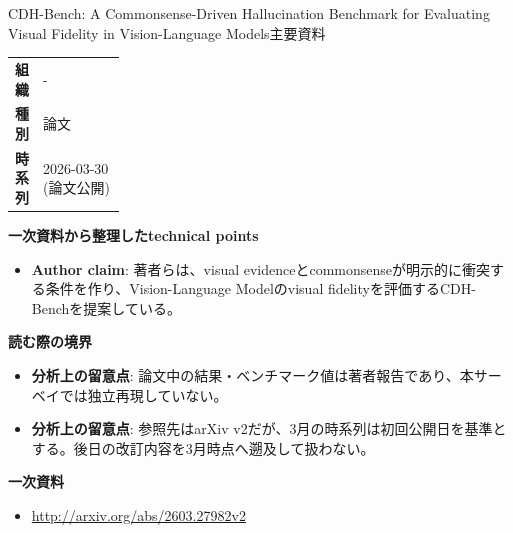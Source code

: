 \begin{technicalnote}{CDH-Bench: A Commonsense-Driven Hallucination Benchmark for Evaluating Visual Fidelity in Vision-Language Models}{主要資料}
\begingroup
\begin{tabularx}{\linewidth}{@{}>{\bfseries}p{0.22\linewidth}X@{}}
組織 & - \\
種別 & 論文 \\
時系列 & 2026-03-30 (論文公開) \\
\end{tabularx}
\smallskip
{\bfseries 一次資料から整理したtechnical points}
\begin{itemize}[leftmargin=1.5em,itemsep=0.35em]
\item \textbf{Author claim}: 著者らは、visual evidenceとcommonsenseが明示的に衝突する条件を作り、Vision-Language Modelのvisual fidelityを評価するCDH-Benchを提案している。
\end{itemize}
\begin{minipage}{\linewidth}
{\bfseries 読む際の境界}
\begin{itemize}[leftmargin=1.5em,itemsep=0.35em]
\item \textbf{分析上の留意点}: 論文中の結果・ベンチマーク値は著者報告であり、本サーベイでは独立再現していない。
\item \textbf{分析上の留意点}: 参照先はarXiv v2だが、3月の時系列は初回公開日を基準とする。後日の改訂内容を3月時点へ遡及して扱わない。
\end{itemize}
\begin{samepage}
{\bfseries 一次資料}
\begingroup\sloppy
\begin{itemize}[leftmargin=1.5em,itemsep=0.25em]
\item {\scriptsize\url{http://arxiv.org/abs/2603.27982v2}}
\end{itemize}
\endgroup
\end{samepage}
\end{minipage}
\endgroup
\end{technicalnote}
\medskip

